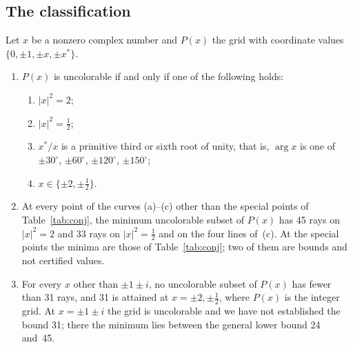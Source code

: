 \subsection{The classification}\label{sec:conjclosed}

\begin{theorem}\label{thm:conj}
Let $x$ be a nonzero complex number and $P(x)$ the grid with coordinate values
$\{0,\pm1,\pm x,\pm x^{*}\}$.
\begin{enumerate}[label=(\roman*)]
\item $P(x)$ is uncolorable if and only if one of the following holds:
\begin{enumerate}[label=(\alph*)]
\item $|x|^2=2$;
\item $|x|^2=\tfrac12$;
\item $x^{*}/x$ is a primitive third or sixth root of unity, that is, $\arg x$ is one of
$\pm30^\circ$, $\pm60^\circ$, $\pm120^\circ$, $\pm150^\circ$;
\item $x\in\{\pm2,\pm\tfrac12\}$.
\end{enumerate}
\item At every point of the curves (a)--(c) other than the special points of
Table~\ref{tab:conj}, the minimum uncolorable subset of $P(x)$ has 45 rays on $|x|^2=2$ and 33
rays on $|x|^2=\tfrac12$ and on the four lines of~(c).  At the special points the minima are
those of Table~\ref{tab:conj}; two of them are bounds and not certified values.
\item For every $x$ other than $\pm1\pm i$, no uncolorable subset of $P(x)$ has fewer than 31
rays, and 31 is attained at $x=\pm2,\pm\tfrac12$, where $P(x)$ is the integer grid.  At
$x=\pm1\pm i$ the grid is uncolorable and we have not established the bound 31; there the
minimum lies between the general lower bound 24 and~45.
\end{enumerate}
\end{theorem}

